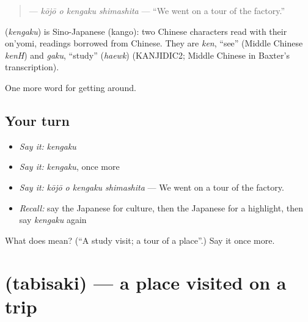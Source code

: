 \begin{quote}
\textbf{ } — \emph{kōjō o kengaku shimashita} — \textquotedblleft{}We went on a tour of the factory.\textquotedblright{}
\end{quote}

\begin{cousinweb}
\textbf{} (\emph{kengaku}) is Sino-Japanese (kango): two Chinese characters read with their on'yomi, readings borrowed from Chinese. They are \emph{ken}, \textquotedblleft{}see\textquotedblright{} (Middle Chinese \emph{kenH}) and \emph{gaku}, \textquotedblleft{}study\textquotedblright{} (\emph{haewk}) (KANJIDIC2; Middle Chinese in Baxter's transcription).
\end{cousinweb}

\begin{grammarlens}[title={What you've built}]
One more word for getting around.
\end{grammarlens}

\subsection*{Your turn}
\begin{itemize}
\raggedright
  \item \emph{Say it:} \emph{kengaku}
  \item \emph{Say it:} \emph{kengaku}, once more
  \item \emph{Say it:} \emph{kōjō o kengaku shimashita} — We went on a tour of the factory.
  \item \emph{Recall:} say the Japanese for culture, then the Japanese for a highlight, then say \emph{kengaku} again
\end{itemize}

\begin{tcolorbox}[breakable,colback=teal!4,colframe=teal!35!black,title={Before you move on}]
What does  mean? (\textquotedblleft{}A study visit; a tour of a place\textquotedblright{}.) Say it once more.
\end{tcolorbox}
\section[\texorpdfstring{\ja{たびさき} (tabisaki)}{たびさき (tabisaki)}]{ (tabisaki) — a place visited on a trip}

\label{lesson:JA-C403-tabisaki}



